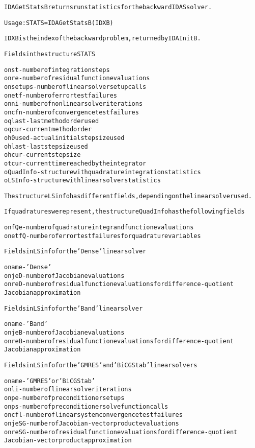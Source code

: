 \begin{alltt}
IDAGetStatsB returns run statistics for the backward IDAS solver.

   Usage: STATS = IDAGetStatsB(IDXB)

   IDXB is the index of the backward problem, returned by IDAInitB.

Fields in the structure STATS

o nst - number of integration steps
o nre - number of residual function evaluations
o nsetups - number of linear solver setup calls
o netf - number of error test failures
o nni - number of nonlinear solver iterations
o ncfn - number of convergence test failures
o qlast - last method order used
o qcur - current method order
o h0used - actual initial step size used
o hlast - last step size used
o hcur - current step size
o tcur - current time reached by the integrator
o QuadInfo - structure with quadrature integration statistics
o LSInfo - structure with linear solver statistics

The structure LSinfo has different fields, depending on the linear solver used.

If quadratures were present, the structure QuadInfo has the following fields

o nfQe - number of quadrature integrand function evaluations
o netfQ - number of error test failures for quadrature variables

  Fields in LSinfo for the 'Dense' linear solver

o name - 'Dense'
o njeD - number of Jacobian evaluations
o nreD - number of residual function evaluations for difference-quotient
         Jacobian approximation

  Fields in LSinfo for the 'Band' linear solver

o name - 'Band'
o njeB - number of Jacobian evaluations
o nreB - number of residual function evaluations for difference-quotient
         Jacobian approximation

  Fields in LSinfo for the 'GMRES' and 'BiCGStab' linear solvers

o name - 'GMRES' or 'BiCGStab'
o nli - number of linear solver iterations
o npe - number of preconditioner setups
o nps - number of preconditioner solve function calls
o ncfl - number of linear system convergence test failures
o njeSG - number of Jacobian-vector product evaluations
o nreSG -  number of residual function evaluations for difference-quotient
          Jacobian-vector product approximation
\end{alltt}






\vspace{0.1in}